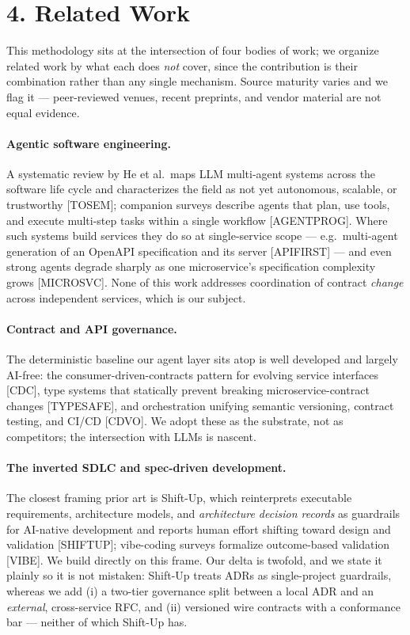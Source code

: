 \documentclass[11pt]{article}
\begin{document}
\section*{4. Related Work}
This methodology sits at the intersection of four bodies of work; we organize related work by what
each does \emph{not} cover, since the contribution is their combination rather than any single
mechanism. Source maturity varies and we flag it --- peer-reviewed venues, recent preprints, and
vendor material are not equal evidence.

\paragraph{Agentic software engineering.} A systematic review by He et al.\ maps LLM multi-agent
systems across the software life cycle and characterizes the field as not yet autonomous, scalable, or
trustworthy [TOSEM]; companion surveys describe agents that plan, use tools, and execute multi-step
tasks within a single workflow [AGENTPROG]. Where such systems build services they do so at
single-service scope --- e.g.\ multi-agent generation of an OpenAPI specification and its server
[APIFIRST] --- and even strong agents degrade sharply as one microservice's specification complexity
grows [MICROSVC]. None of this work addresses coordination of contract \emph{change} across independent
services, which is our subject.

\paragraph{Contract and API governance.} The deterministic baseline our agent layer sits atop is well
developed and largely AI-free: the consumer-driven-contracts pattern for evolving service interfaces
[CDC], type systems that statically prevent breaking microservice-contract changes [TYPESAFE], and
orchestration unifying semantic versioning, contract testing, and CI/CD [CDVO]. We adopt these as the
substrate, not as competitors; the intersection with LLMs is nascent.

\paragraph{The inverted SDLC and spec-driven development.} The closest framing prior art is Shift-Up,
which reinterprets executable requirements, architecture models, and \emph{architecture decision
records} as guardrails for AI-native development and reports human effort shifting toward design and
validation [SHIFTUP]; vibe-coding surveys formalize outcome-based validation [VIBE]. We build directly
on this frame. Our delta is twofold, and we state it plainly so it is not mistaken: Shift-Up treats
ADRs as single-project guardrails, whereas we add (i) a two-tier governance split between a local ADR
and an \emph{external}, cross-service RFC, and (ii) versioned wire contracts with a conformance bar ---
neither of which Shift-Up has.
\end{document}
